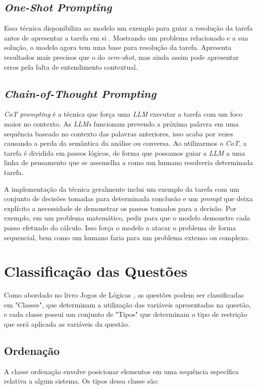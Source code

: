 \documentclass[12pt]{article}
\begin{document}
\subsection{\textit{One-Shot Prompting}}

Essa técnica disponibiliza ao modelo um exemplo para guiar a resolução da tarefa antes de apresentar a tarefa em si \cite{misc3}. Mostrando um problema relacionado e a sua solução, o modelo agora tem uma base para resolução da tarefa. Apresenta resultados mais precisos que o do \textit{zero-shot}, mas ainda assim pode apresentar erros pela falta de entendimento contextual.

\subsection{\textit{Chain-of-Thought Prompting}}

\textit{CoT prompting} é a técnica que força uma \textit{LLM} executar a tarefa com um foco maior no contexto. As \textit{LLMs} funcionam prevendo a próxima palavra em uma sequência baseado no contexto das palavras anteriores, isso acaba por vezes causando a perda da semântica da análise ou conversa. Ao utilizarmos o \textit{CoT}, a tarefa é dividida em passos lógicos, de forma que possamos guiar a \textit{LLM} a uma linha de pensamento que se assemelha a como um humano resolveria determinada tarefa. \cite{article1}

    A implementação da técnica geralmente inclui um exemplo da tarefa com um conjunto de decisões tomadas para determinada conclusão e um \textit{prompt} que deixa explícito a necessidade de demonstrar os passos tomados para a decisão. Por exemplo, em um problema matemático, pedir para que o modelo demonstre cada passo efetuado do cálculo. Isso força o modelo a atacar o problema de forma sequencial, bem como um humano faria para um problema extenso ou complexo.

\section{Classificação das Questões} \label{sec:class}
Como abordado no livro Jogos de Lógicas \cite{book1}, as questões podem ser classificadas em "Classes", que determinam a utilização das variáveis apresentadas na questão, e cada classe possui um conjunto de "Tipos" que determinam o tipo de restrição que será aplicada as variáveis da questão.

\subsection{Ordenação}
A classe ordenação envolve posicionar elementos em uma sequência específica relativa a algum sistema. Os tipos dessa classe são:
\end{document}
